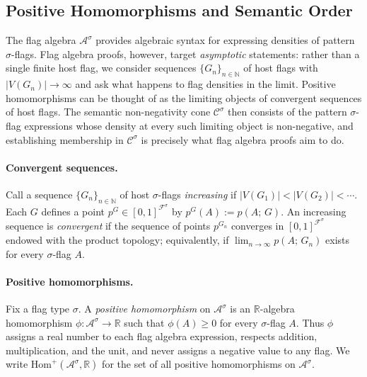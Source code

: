 \documentclass{article}
\newcommand{\poshom}[1]{\mathrm{Hom}^+(\mathcal{A}^{#1}, \mathbb{R})}
\newcommand{\den}[2]{p(#1;\,#2)}
\begin{document}
\subsection{Positive Homomorphisms and Semantic Order}


The flag algebra $\mathcal{A}^\sigma$ provides algebraic syntax for expressing
densities of pattern $\sigma$-flags.  Flag algebra proofs, however, target
\emph{asymptotic} statements: rather than a single finite host flag, we
consider sequences $\{G_n\}_{n\in\mathbb{N}}$ of host flags with $|V(G_n)|\to\infty$ and ask
what happens to flag densities in the limit.  Positive homomorphisms can be thought of as the limiting objects of convergent
sequences of host flags.  The semantic non-negativity cone
$\mathcal{C}^\sigma$ then consists of the pattern $\sigma$-flag expressions
whose density at every such limiting object is non-negative, and establishing
membership in $\mathcal{C}^\sigma$ is precisely what flag algebra proofs aim
to do.

\paragraph{Convergent sequences.}
Call a sequence $\{G_n\}_{n\in\mathbb{N}}$ of host $\sigma$-flags \emph{increasing} if
$|V(G_1)| < |V(G_2)| < \cdots$.  Each $G$ defines a point
$p^G \in [0,1]^{\mathcal{F}^\sigma}$ by $p^G(A) := \den{A}{G}$.
An increasing sequence is \emph{convergent} if the sequence of points $p^{G_n}$
converges in $[0,1]^{\mathcal{F}^\sigma}$ endowed with the product topology;
equivalently, if $\lim_{n\to\infty}\den{A}{G_n}$ exists for every $\sigma$-flag $A$.

\paragraph{Positive homomorphisms.}
Fix a flag type $\sigma$.  A \emph{positive homomorphism} on
$\mathcal{A}^\sigma$ is an $\mathbb{R}$-algebra homomorphism
$\phi:\mathcal{A}^\sigma \to \mathbb{R}$ such that
$\phi(A) \geq 0$ for every $\sigma$-flag $A$.  Thus $\phi$ assigns a real
number to each flag algebra expression, respects addition, multiplication, and the unit, and
never assigns a negative value to any flag.
We write $\poshom{\sigma}$ for the set of all positive homomorphisms on
$\mathcal{A}^\sigma$.
\end{document}
